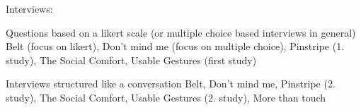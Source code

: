 \documentclass{sigchi}
\begin{document}
Interviews:

Questions based on a likert scale (or multiple choice based interviews in general)
Belt (focus on likert), Don’t mind me (focus on multiple choice), Pinstripe (1. study), The Social Comfort, Usable Gestures (first study)

Interviews structured like a conversation
Belt, Don’t mind me, Pinstripe (2. study), The Social Comfort, Usable Gestures (2. study), More than touch




\end{document}
